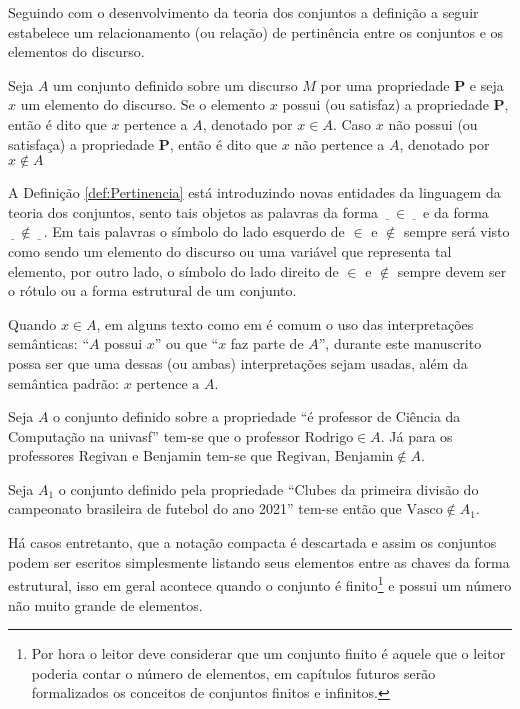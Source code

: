 Seguindo com o desenvolvimento da teoria dos conjuntos a definição a seguir estabelece um relacionamento (ou relação) de pertinência entre os conjuntos e os elementos do discurso.

\begin{definition}[Pertinência]\label{def:Pertinencia}
	Seja $A$ um conjunto definido sobre um discurso $M$ por uma propriedade $\textbf{P}$ e seja $x$ um elemento do discurso. Se o elemento $x$ possui (ou satisfaz) a propriedade $\textbf{P}$, então é dito que $x$ pertence a $A$, denotado por $x \in A$. Caso $x$ não possui (ou satisfaça) a propriedade $\textbf{P}$, então é dito que $x$ não pertence a $A$, denotado por $x \notin A$
\end{definition}

A Definição \ref{def:Pertinencia} está introduzindo novas entidades da linguagem da teoria dos conjuntos, sento tais objetos as palavras da forma $\underline{\ \ \ } \in \underline{\ \ \ }$ e da forma $\underline{\ \ \ } \notin \underline{\ \ \ }$. Em tais palavras o símbolo do lado esquerdo de $\in$ e $\notin$ sempre será visto como sendo um elemento do discurso ou uma variável que representa tal elemento, por outro lado, o símbolo do lado direito de $\in$ e $\notin$ sempre devem ser o rótulo ou a forma estrutural de um conjunto.

\begin{remark}
	Quando $x \in A$, em alguns texto como em \cite{lipschutz1978-TC} é comum o uso das interpretações semânticas: ``$A$ possui $x$'' ou que ``$x$ faz parte de $A$'', durante este manuscrito possa ser que uma dessas (ou ambas) interpretações sejam usadas, além da semântica padrão: $x \mbox{ pertence a }  A$.
\end{remark}

\begin{example}
	Seja $A$ o conjunto definido sobre a propriedade ``é professor de Ciência da Computação na univasf'' tem-se que o professor $\mbox{Rodrigo} \in A$. Já para os professores Regivan e Benjamin tem-se que $\mbox{Regivan, Benjamin} \notin A$. 
\end{example}

\begin{example}
	Seja $A_1$ o conjunto definido pela propriedade ``Clubes da primeira divisão do campeonato brasileira de futebol do ano 2021'' tem-se então que $\mbox{Vasco} \notin A_1$.
\end{example}

Há casos entretanto, que a notação compacta é descartada e assim os conjuntos podem ser escritos simplesmente listando seus elementos entre as chaves da forma estrutural, isso em geral acontece quando o conjunto é finito\footnote{Por hora o leitor deve considerar que um conjunto finito é aquele que o leitor poderia contar o número de elementos, em capítulos futuros serão formalizados os conceitos de conjuntos finitos e infinitos.} e possui um número não muito grande de elementos.

